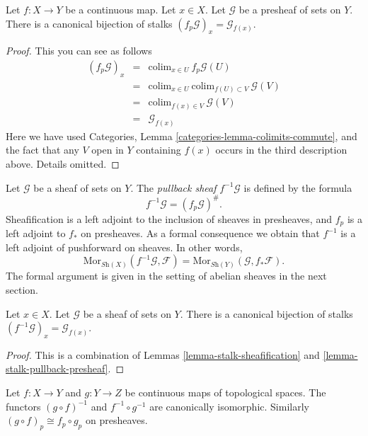 \begin{lemma}
\label{lemma-stalk-pullback-presheaf}
Let $f : X \to Y$ be a continuous map.
Let $x \in X$. Let $\mathcal{G}$ be a presheaf of sets on $Y$.
There is a canonical bijection of stalks
$(f_p\mathcal{G})_x = \mathcal{G}_{f(x)}$.
\end{lemma}

\begin{proof}
This you can see as follows
\begin{eqnarray*}
(f_p\mathcal{G})_x
& = &
\text{colim}_{x \in U}\ f_p\mathcal{G}(U) \\
& = &
\text{colim}_{x \in U}\ \text{colim}_{f(U) \subset V}\ \mathcal{G}(V) \\
& = &
\text{colim}_{f(x) \in V}\ \mathcal{G}(V) \\
& = &
\mathcal{G}_{f(x)}
\end{eqnarray*}
Here we have used
Categories, Lemma \ref{categories-lemma-colimits-commute},
and the fact that any $V$ open in $Y$ containing $f(x)$
occurs in the third description above. Details omitted.
\end{proof}

\noindent
Let $\mathcal{G}$ be a sheaf of sets on $Y$.
The {\it pullback sheaf} $f^{-1}\mathcal{G}$ is defined
by the formula
$$
f^{-1}\mathcal{G} = (f_p\mathcal{G})^\# .
$$
Sheafification is a left adjoint to the inclusion
of sheaves in presheaves, and $f_p$ is a left
adjoint to $f_*$ on presheaves. As a formal consequence
we obtain that $f^{-1}$ is a left adjoint of
pushforward on sheaves. In other words,
$$
\text{Mor}_{\textit{Sh}(X)}(f^{-1}\mathcal{G}, \mathcal{F})
=
\text{Mor}_{\textit{Sh}(Y)}(\mathcal{G}, f_*\mathcal{F}).
$$
The formal argument is given in the setting of abelian
sheaves in the next section.

\begin{lemma}
\label{lemma-stalk-pullback}
Let $x \in X$. Let $\mathcal{G}$ be a sheaf of sets on $Y$.
There is a canonical bijection of stalks
$(f^{-1}\mathcal{G})_x = \mathcal{G}_{f(x)}$.
\end{lemma}

\begin{proof}
This is a combination of Lemmas \ref{lemma-stalk-sheafification}
and \ref{lemma-stalk-pullback-presheaf}.
\end{proof}

\begin{lemma}
\label{lemma-pullback-composition}
Let $f : X \to Y$ and $g : Y \to Z$ be continuous maps
of topological spaces. The functors $(g \circ f)^{-1}$
and $f^{-1} \circ g^{-1}$ are canonically isomorphic.
Similarly $(g \circ f)_p \cong f_p \circ g_p$ on
presheaves.
\end{lemma}

